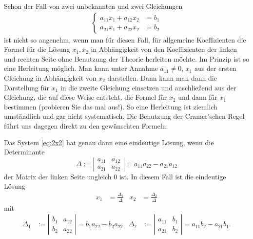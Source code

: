 Schon der Fall von zwei unbekannten und zwei Gleichungen 
\begin{align}
	\left\{
	\begin{matrix}
		a_{11} x_1 + a_{12} x_2 & = b_1
		\\ a_{21} x_1 + a_{22} x_2 & = b_2
	\end{matrix} 
	\right.
	\label{eq:2x2}
\end{align}
ist nicht so angenehm, wenn man für diesen Fall, für allgemeine Koeffizienten die Formel für die Lösung $x_1, x_2$ in Abhängigkeit von den Koeffizienten der linken und rechten Seite ohne Benutzung der Theorie herleiten möchte. Im Prinzip ist so eine Herleitung möglich. Man kann unter Annahme $a_{11} \ne 0$, $x_1$  aus der ersten Gleichung in Abhängigkeit von $x_2$ darstellen. Dann kann man dann die Darstellung für $x_1$ in die zweite Gleichung einsetzen und anschließend aus der Gleichung, die auf diese Weise entsteht, die Formel für $x_2$ und dann für $x_1$ bestimmen (probieren Sie das mal aus!). So eine Herleitung ist ziemlich umständlich und gar nicht systematisch. Die Benutzung der Cramer'schen Regel führt uns dagegen direkt zu den gewünschten Formeln: 

\begin{bsp}
	Das System \eqref{eq:2x2} hat genau dann eine eindeutige Lösung, wenn die Determinante 
	\[ 
		\Delta := \left| \begin{matrix}
	a_{11} & a_{12} \\
	a_{21} & a_{22}
	\end{matrix} \right|
	= a_{11}a_{22} - a_{21}a_{12}
	\]
	der Matrix der linken Seite ungleich $0$ ist. In diesem Fall ist die eindeutige Lösung
	\begin{align*}
		x_1 & = \frac{\Delta_1}{\Delta} &  x_2 & = \frac{\Delta_2}{\Delta}
	\end{align*}
	mit 
	\begin{align*}
\Delta_1 &:= \left|\begin{matrix}
b_1 & a_{12} \\
b_2 & a_{22}
\end{matrix}\right| = b_1 a_{22} - b_2 a_{22} &
\Delta_2 &:= \left|\begin{matrix}
a_{11} & b_1 \\
a_{21} & b_2
\end{matrix}\right| = a_{11} b_2 - a_{21} b_1.
\end{align*}
\end{bsp}


